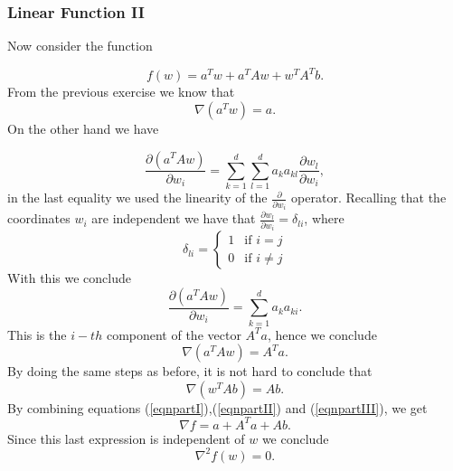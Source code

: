 \documentclass[11pt]{article}
\theoremstyle{plain}
\begin{document}
\subsubsection{Linear Function II}
Now consider the function

\begin{equation*}
f(w)=a^{T}w+a^{T}Aw+w^{T}A^{T}b.
\end{equation*}
From the previous exercise we know that 
\begin{equation}\label{eqnpartI}
\nabla(a^{T}w)=a.
\end{equation}
On the other hand we have

\begin{equation*}
\frac{\partial(a^{T}Aw)}{\partial w_{i}}=\sum_{k=1}^{d}\sum_{l=1}^{d}a_{k}a_{kl}\frac{\partial w_{l}}{\partial w_{i}},
\end{equation*}
in the last equality we used the linearity of the $\frac{\partial}{\partial w_{i}}$ operator. Recalling that the coordinates $w_{i}$ 
are independent we have that $\frac{\partial w_{l}}{\partial w_{i}}=\delta_{li}$, where 
\begin{equation*}
\delta_{li}=\left\{
		\begin{array}{ll}
			1 &\mbox{if } i=j \\
			0 &\mbox{if } i\neq j
		\end{array}
	\right.
\end{equation*}
With this we conclude
\begin{equation*}
\frac{\partial(a^{T}Aw)}{\partial w_{i}}=\sum_{k=1}^{d}a_{k}a_{ki}.
\end{equation*}
This is the $i-th$ component of the vector $A^{T}a$, hence we conclude
\begin{equation}\label{eqnpartII}
\nabla(a^{T}Aw)=A^{T}a.
\end{equation}
By doing the same steps as before, it is not hard to conclude that 
\begin{equation}\label{eqnpartIII}
\nabla(w^{T}Ab)=Ab.
\end{equation}
By combining equations (\ref{eqnpartI}),(\ref{eqnpartII}) and (\ref{eqnpartIII}), we get
\begin{equation*}
\nabla f=a+A^{T}a+Ab.
\end{equation*}
Since this last expression is independent of $w$ we conclude
\begin{equation*}
\nabla^{2}f(w)=0.
\end{equation*}
\end{document}
